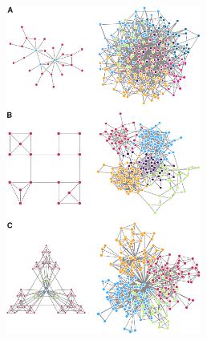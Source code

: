 \begin{figure}[hp!]
    \centering
    \includegraphics[width=0.57\textwidth]{img/intro/3_coexpr/intro_3_coexpr_ravasz_hierarchical_clustering.pdf}

\end{figure}
